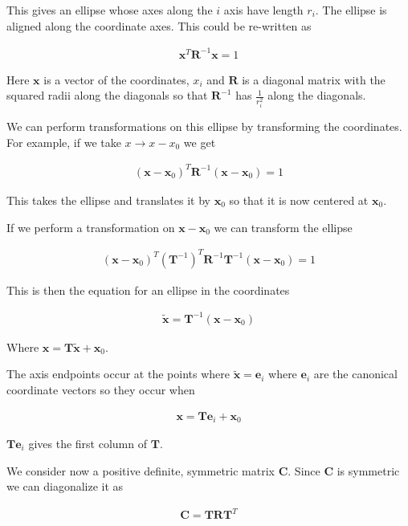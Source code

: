 \documentclass[12pt]{article}
\newcommand{\bv}[1]{\boldsymbol{#1}}
\begin{document}
This gives an ellipse whose axes along the $i$ axis have length $r_i$. The ellipse is aligned along the coordinate axes. This could be re-written as

\begin{align}
\bv{x}^T\bv{R}^{-1}\bv{x} = 1
\end{align}

Here $\bv{x}$ is a vector of the coordinates, $x_i$ and $\bv{R}$ is a diagonal matrix with the squared radii along the diagonals so that $\bv{R}^{-1}$ has $\frac{1}{r_i^2}$ along the diagonals.

We can perform transformations on this ellipse by transforming the coordinates. For example, if we take $x\rightarrow x-x_0$ we get

\begin{align}
(\bv{x}-\bv{x}_0)^T \bv{R}^{-1}(\bv{x}-\bv{x}_0) = 1
\end{align}

This takes the ellipse and translates it by $\bv{x}_0$ so that it is now centered at $\bv{x}_0$.

If we perform a transformation on $\bv{x}-\bv{x}_0$ we can transform the ellipse

\begin{align}
(\bv{x}-\bv{x}_0)^T(\bv{T}^{-1})^T \bv{R}^{-1} \bv{T}^{-1}(\bv{x}-\bv{x}_0) = 1
\end{align}

This is then the equation for an ellipse in the coordinates 

\begin{align}
\bv{\tilde{x}} = \bv{T}^{-1}(\bv{x}-\bv{x}_0)
\end{align}

Where $\bv{x} = \bv{T}\bv{\tilde{x}} + \bv{x}_0$.

The axis endpoints occur at the points where $\bv{\tilde{x}} = \bv{e}_i$ where $\bv{e}_i$ are the canonical coordinate vectors so they occur when

\begin{align}
\bv{x} = \bv{T}\bv{e}_i + \bv{x}_0
\end{align}

$\bv{T}\bv{e}_i$ gives the first column of $\bv{T}$. 

We consider now a positive definite, symmetric matrix $\bv{C}$. Since $\bv{C}$ is symmetric we can diagonalize it as

\begin{align}
\bv{C} = \bv{T} \bv{R} \bv{T}^T
\end{align}
\end{document}

